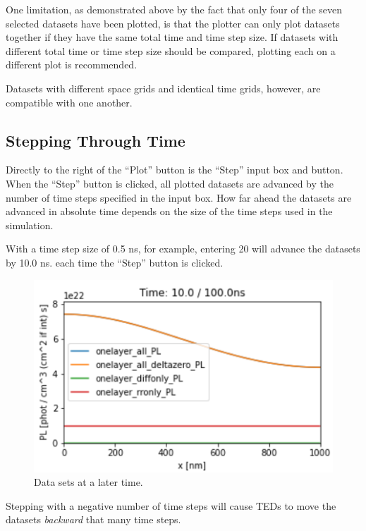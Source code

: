\documentclass[11pt,letterpaper,titlepage]{article}
\begin{document}
		\par One limitation, as demonstrated above by the fact that only four of the seven selected datasets have been plotted, is that the plotter can only plot datasets together if they have the same total time and time step size. If datasets with different total time or time step size should be compared, plotting each on a different plot is recommended.
		
		\par Datasets with different space grids and identical time grids, however, are compatible with one another.
		
		\subsection{Stepping Through Time}
		\par Directly to the right of the “Plot” button is the “Step” input box and button. When the “Step” button is clicked, all plotted datasets are advanced by the number of time steps specified in the input box. How far ahead the datasets are advanced in absolute time depends on the size of the time steps used in the simulation.
		
		\par With a time step size of 0.5 ns, for example, entering 20 will advance the datasets by 10.0 ns. each time the “Step” button is clicked.
		
		\begin{figure}[H]
			\label{fig:step_forward_example}
			\centering
			\includegraphics[scale=1.0]{"step_forward_example"}
			\caption{Data sets at a later time.}
		\end{figure}
	
		\par Stepping with a negative number of time steps will cause TEDs to move the datasets \textit{backward} that many time steps.
		
\end{document}
